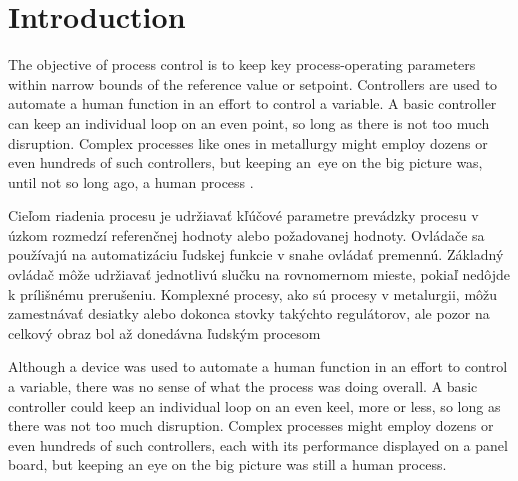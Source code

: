 \documentclass[]{tukediphc}
\begin{document}
\renewcommand\theHfigure{\theHsection.\arabic{figure}}
\renewcommand\theHtable{\theHsection.\arabic{table}}


\prvastrana


\thispagestyle{empty}
\tableofcontents
\newpage
%
%


\setcounter{page}{1}
\setcounter{equation}{0}
\setcounter{figure}{0}
\setcounter{table}{0}

\section{Introduction}

The objective of process control is to keep key process-operating parameters within narrow bounds of the reference value or setpoint. Controllers are used to automate a human function in an effort to control a variable. A basic controller can keep an individual loop on an even point, so long as there is not too much disruption. Complex processes like ones in metallurgy might employ dozens or even hundreds of such controllers, but keeping an~eye on the big picture was, until not so long ago, a human process \cite{Al-Megren2016}.

Cieľom riadenia procesu je udržiavať kľúčové parametre prevádzky procesu v úzkom rozmedzí referenčnej hodnoty alebo požadovanej hodnoty. Ovládače sa používajú na automatizáciu ľudskej funkcie v snahe ovládať premennú. Základný ovládač môže udržiavať jednotlivú slučku na rovnomernom mieste, pokiaľ nedôjde k prílišnému prerušeniu. Komplexné procesy, ako sú procesy v metalurgii, môžu zamestnávať desiatky alebo dokonca stovky takýchto regulátorov, ale pozor na celkový obraz bol až donedávna ľudským procesom \cite{Al-Megren2016}

Although a device was used to automate a human function in an effort to control a variable, there was no sense of what the process was doing overall. A basic controller could keep an individual loop on an even keel, more or less, so long as there was not too much disruption. Complex processes might employ dozens or even hundreds of such controllers, each with its performance displayed on a panel board, but keeping an eye on the big picture was still a human process.	
\end{document}
